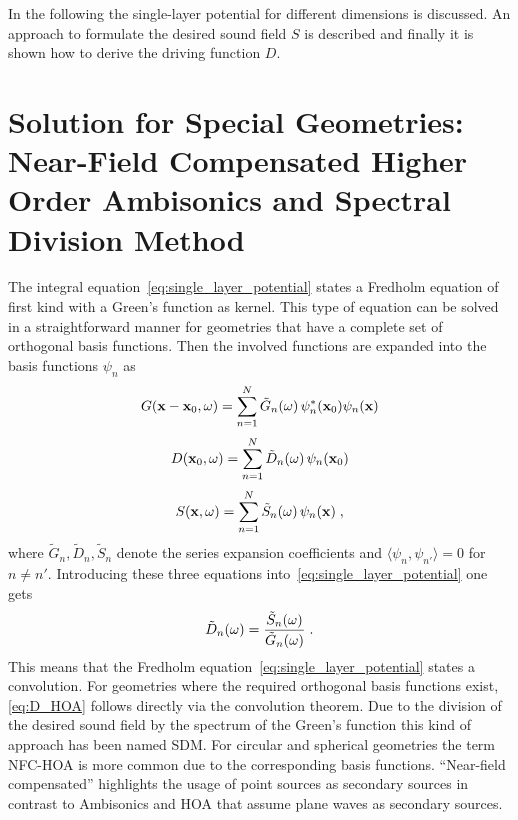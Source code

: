 In the following the single-layer potential for different
dimensions is discussed. An approach
to formulate the desired sound field $S$ is described and finally it is
shown how to derive the driving function $D$.



\section[Near-Field Compensated Higher Order Ambisonics]{Solution for Special
Geometries: Near-Field Compensated Higher Order Ambisonics and Spectral Division Method}
\label{sec:HOA_SDM}

The integral equation~\eqref{eq:single_layer_potential} states a Fredholm
equation of first kind with a Green's function as kernel. This type of equation
can be solved in a straightforward manner for geometries that have a complete
set of orthogonal basis functions. Then the involved functions are expanded
into the basis functions $\psi_n$ as\autocite[Compare][p.\,940]{Morse1981}
%
\begin{equation}
    G(\x-\x_0,\omega) = \sum_{n=1}^N \tilde{G}_n(\omega) \,
        \psi_n^*(\x_0) \psi_n(\x)
    \label{eq:G_expansion}
\end{equation}
%
\begin{equation}
    D(\x_0,\omega) = \sum_{n=1}^N \tilde{D}_n(\omega) \,
        \psi_n(\x_0)
    \label{eq:D_expansion}
\end{equation}
%
\begin{equation}
    S(\x,\omega) = \sum_{n=1}^N \tilde{S}_n(\omega) \,
        \psi_n(\x) \qc
    \label{eq:S_expansion}
\end{equation}
%
where $\tilde{G}_n, \tilde{D}_n, \tilde{S}_n$ denote the series expansion
coefficients and \linebreak $\langle\psi_n, \psi_{n'}\rangle = 0$ for $n \ne n'$.
Introducing these three equations
into~\eqref{eq:single_layer_potential} one gets
%
\begin{equation}
    \tilde{D}_n(\omega) = \frac{\tilde{S}_n(\omega)}{\tilde{G}_n(\omega)} \qp
    \label{eq:D_HOA}
\end{equation}
%
This means that the Fredholm equation~\eqref{eq:single_layer_potential}
states a convolution. For geometries where
the required orthogonal basis functions exist, \eqref{eq:D_HOA} follows directly via
the convolution theorem.\autocite[Compare][p.\,1013]{Arfken2005}
Due to the division of the desired sound field by the spectrum of the
Green's function this kind
of approach has been named \acf{SDM}.
For circular and spherical geometries the term \acf{NFC-HOA} is more common due
to the corresponding basis functions. ``Near-field compensated'' highlights the
usage of point sources as secondary sources in contrast to Ambisonics and
\acf{HOA} that assume plane waves as secondary sources.

